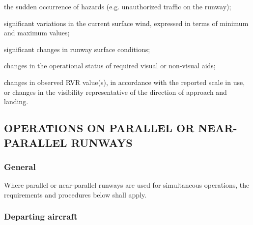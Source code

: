 \begin{enumnoss}
    \begin{enumalph}
        \item the sudden occurrence of hazards (e.g. unauthorized traffic on the runway);
        \item significant variations in the current surface wind, expressed in terms of minimum and maximum values;
        \item significant changes in runway surface conditions;
        \item changes in the operational status of required visual or non-visual aids;
        \item changes in observed RVR value(s), in accordance with the reported scale in use, or changes in the visibility representative of the direction of approach and landing.
    \end{enumalph}
\end{enumnoss}

\subsection[Operations on parallel or near-parallel runways]{OPERATIONS ON PARALLEL OR NEAR-PARALLEL RUNWAYS} \label{6.7}

\subsubsection{General}

Where parallel or near-parallel runways are used for simultaneous operations, the requirements and procedures below shall apply.

\subsubsection{Departing aircraft}

